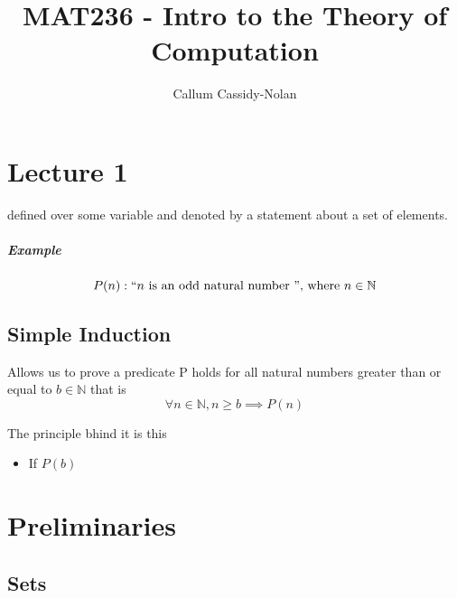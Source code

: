 \documentclass[11pt]{book}
\title{MAT236 - Intro to the Theory of Computation}
\author{Callum Cassidy-Nolan}
\begin{document}


\chapter{Lecture 1}%
\label{chp:lecture_1}

\begin{defn}[Predicate]\label{defn:predicate}
    defined over some variable and denoted by a statement about a set of elements.
    \paragraph{Example}
    \[
        P(n): `` n \text{ is an odd natural number }  "\text{, where } n \in \mathbb{N} 
    \]
\end{defn}

\section{Simple Induction}%
\label{sec:simple_induction}

Allows us to prove a predicate P holds for all natural numbers greater than or equal to $b\in \mathbb{N} $ that is 
\[
\forall n \in \mathbb{N}, n \ge b \implies P\left(n\right) 
\]

The principle bhind it is this
\begin{itemize}
    \item If $P\left(b\right) $ 
\end{itemize}




\chapter{Preliminaries}%
\label{chp:preliminaries}

\section{Sets}%
\label{sec:sets}
\end{document}
